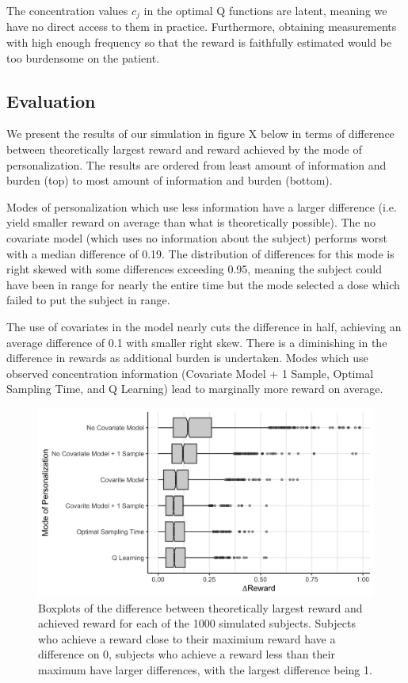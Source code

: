 The concentration values $ c_j $ in the optimal Q functions are latent, meaning we have no direct access to them in practice. Furthermore, obtaining measurements with high enough frequency so that the reward is faithfully estimated would be too burdensome on the patient. 


\subsection{Evaluation}

We present the results of our simulation in figure X below in terms of difference between theoretically largest reward and reward achieved by the mode of personalization.  The results are ordered from least amount of information and burden (top) to most amount of information and burden (bottom).

Modes of personalization which use less information have a larger difference (i.e. yield smaller reward on average than what is theoretically possible).  The no covariate model (which uses no information about the subject) performs worst with a median difference of 0.19.  The distribution of differences for this mode is right skewed with some differences exceeding 0.95, meaning the subject could have been in range for nearly the entire time but the mode selected a dose which failed to put the subject in range. 

The use of covariates in the model nearly cuts the difference in half, achieving an average difference of 0.1 with smaller right skew.  There is a diminishing in the difference in rewards as additional burden is undertaken. Modes which use observed concentration information (Covariate Model + 1 Sample, Optimal Sampling Time, and Q Learning) lead to marginally more reward on average.


\begin{figure}
	\centering
	\includegraphics[width=1\linewidth]{figures/models_of_personalization_differences}
	\caption{Boxplots of the difference between theoretically largest reward and achieved reward for each of the 1000 simulated subjects. Subjects who achieve a reward close to their maximium reward have a difference on 0, subjects who achieve a reward less than their maximum have larger differences, with the largest difference being 1.}
	\label{fig:modelsofpersonalizationdifferences}
\end{figure}
